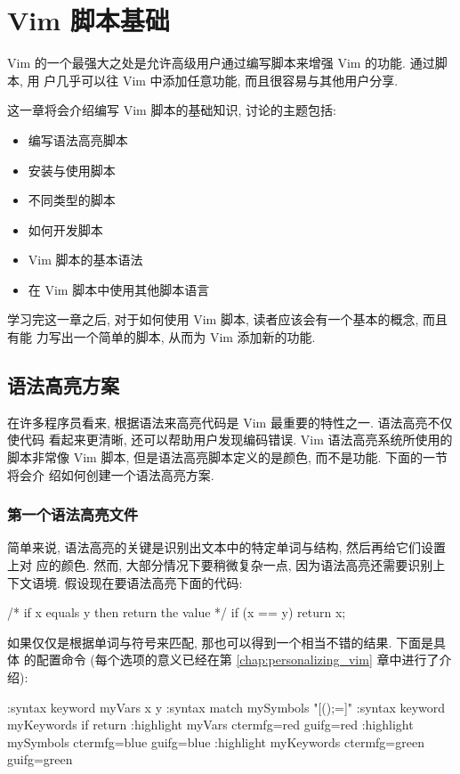 \chapter{Vim 脚本基础}
\label{chap:basic_vim_scripting}

Vim 的一个最强大之处是允许高级用户通过编写脚本来增强 Vim 的功能. 通过脚本, 用
户几乎可以往 Vim 中添加任意功能, 而且很容易与其他用户分享.

这一章将会介绍编写 Vim 脚本的基础知识, 讨论的主题包括:
\begin{itemize}
    \item 编写语法高亮脚本
    \item 安装与使用脚本
    \item 不同类型的脚本
    \item 如何开发脚本
    \item Vim 脚本的基本语法
    \item 在 Vim 脚本中使用其他脚本语言
\end{itemize}

学习完这一章之后, 对于如何使用 Vim 脚本, 读者应该会有一个基本的概念, 而且有能
力写出一个简单的脚本, 从而为 Vim 添加新的功能.

\section{语法高亮方案}
\label{sec:syntax_color_schemes}

在许多程序员看来, 根据语法来高亮代码是 Vim 最重要的特性之一. 语法高亮不仅使代码
看起来更清晰, 还可以帮助用户发现编码错误. Vim 语法高亮系统所使用的脚本非常像
Vim 脚本, 但是语法高亮脚本定义的是颜色, 而不是功能. 下面的一节将会介
绍如何创建一个语法高亮方案.

\subsection{第一个语法高亮文件}
\label{subsec:your_first_syntax_color_file}

简单来说, 语法高亮的关键是识别出文本中的特定单词与结构, 然后再给它们设置上对
应的颜色. 然而, 大部分情况下要稍微复杂一点, 因为语法高亮还需要识别上下文语境.
假设现在要语法高亮下面的代码:
\begin{vimcode}
/* if x equals y then return the value */
if (x == y)
  {
    return x;
  }
\end{vimcode}

如果仅仅是根据单词与符号来匹配, 那也可以得到一个相当不错的结果. 下面是具体
的配置命令 (每个选项的意义已经在第 \ref{chap:personalizing_vim} 章中进行了介
绍):
\begin{vimcode}
:syntax keyword myVars x y
:syntax match mySymbols "[{}();=]"
:syntax keyword myKeywords if return
:highlight myVars ctermfg=red guifg=red
:highlight mySymbols ctermfg=blue guifg=blue
:highlight myKeywords ctermfg=green guifg=green
\end{vimcode}

